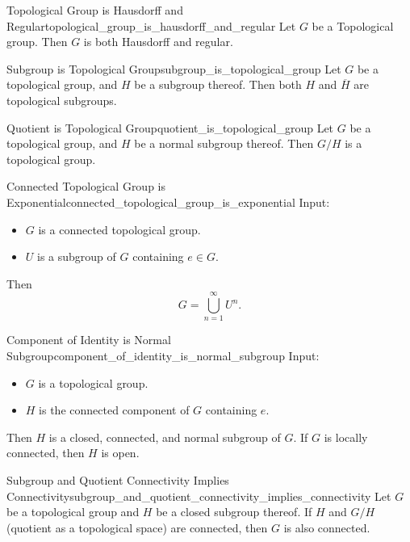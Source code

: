 \documentclass{article}
\begin{document}
\begin{theorem}{Topological Group is Hausdorff and Regular}{topological_group_is_hausdorff_and_regular}
    Let $G$ be a Topological group.
    Then $G$ is both Hausdorff and regular.
\end{theorem}

\begin{proposition}{Subgroup is Topological Group}{subgroup_is_topological_group}
    Let $G$ be a topological group, and $H$ be a subgroup thereof.
    Then both $H$ and $\overline{H}$ are topological subgroups.
\end{proposition}

\begin{proposition}{Quotient is Topological Group}{quotient_is_topological_group}
    Let $G$ be a topological group, and $H$ be a normal subgroup thereof.
    Then $G/H$ is a topological group.
\end{proposition}

\begin{proposition}{Connected Topological Group is Exponential}{connected_topological_group_is_exponential}
    Input:
    \begin{itemize}
        \item $G$ is a connected topological group.
        \item $U$ is a subgroup of $G$ containing $e\in G$.
    \end{itemize}
    Then
    \[ G = \bigcup_{n=1}^\infty U^n. \]
\end{proposition}

\begin{theorem}{Component of Identity is Normal Subgroup}{component_of_identity_is_normal_subgroup}
    Input:
    \begin{itemize}
        \item $G$ is a topological group.
        \item $H$ is the connected component of $G$ containing $e$.
    \end{itemize}
    Then $H$ is a closed, connected, and normal subgroup of $G$. If $G$ is locally connected, then $H$ is open.
\end{theorem}

\begin{proposition}{Subgroup and Quotient Connectivity Implies Connectivity}{subgroup_and_quotient_connectivity_implies_connectivity}
    Let $G$ be a topological group and $H$ be a closed subgroup thereof.
    If $H$ and $G/H$ (quotient as a topological space) are connected, then $G$ is also connected.
\end{proposition}
\end{document}
